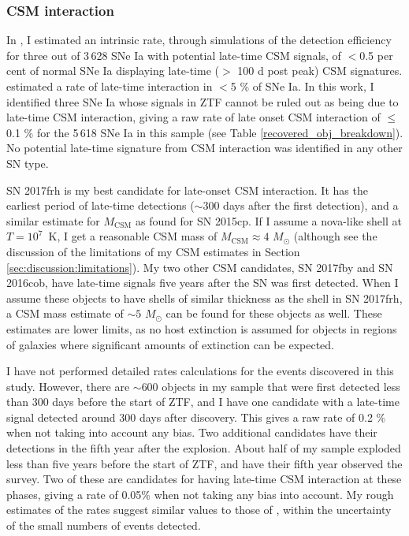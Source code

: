 \documentclass[a4paper,oneside,12pt, class=Latex/Classes/PhDthesisPSnPDF, crop=false]{standalone}
\begin{document}
\subsubsection{CSM interaction}
In \citet{Terwel_2024_paper1}, I estimated an intrinsic rate, through simulations of the detection efficiency for three out of 3\,628 SNe Ia with potential late-time CSM signals, of $<$0.5 per cent of normal SNe Ia displaying late-time ($>$ 100 d post peak) CSM signatures. \cite{GALEX_Late_CSM} estimated a rate of late-time interaction in $<$5 \% of SNe Ia. In this work, I identified three SNe Ia whose signals in ZTF cannot be ruled out as being due to late-time CSM interaction, giving a raw rate of late onset CSM interaction of $\leq$0.1 \% for the 5\,618 SNe Ia in this sample (see Table \ref{recovered_obj_breakdown}). No potential late-time signature from CSM interaction was identified in any other SN type.

SN 2017frh is my best candidate for late-onset CSM interaction. It has the earliest period of late-time detections ($\sim 300$ days after the first detection), and a similar estimate for $M_\text{CSM}$ as \citet{2015cp} found for SN 2015cp. If I assume a nova-like shell at $T=10^7$~K, I get a reasonable CSM mass of $M_\text{CSM} \approx 4$ $M_\odot$ (although see the discussion of the limitations of my CSM estimates in Section \ref{sec:discussion:limitations}). My two other CSM candidates, SN 2017fby and SN 2016cob, have late-time signals five years after the SN was first detected. When I assume these objects to have shells of similar thickness as the shell in SN 2017frh, a CSM mass estimate of $\sim 5$ $M_\odot$ can be found for these objects as well. These estimates are lower limits, as no host extinction is assumed for objects in regions of galaxies where significant amounts of extinction can be expected.

I have not performed detailed rates calculations for the events discovered in this study. However, there are $\sim600$ objects in my sample that were first detected less than 300 days before the start of ZTF, and I have one candidate with a late-time signal detected around 300 days after discovery. This gives a raw rate of 0.2 \% when not taking into account any bias. Two additional candidates have their detections in the fifth year after the explosion. About half of my sample exploded less than five years before the start of ZTF, and have their fifth year observed the survey. Two of these are candidates for having late-time CSM interaction at these phases, giving a rate of 0.05\% when not taking any bias into account. My rough estimates of the rates suggest similar values to those of \citet{Terwel_2024_paper1}, within the uncertainty of the small numbers of events detected.
\end{document}
